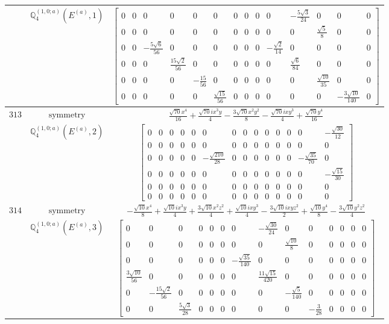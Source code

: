 \documentclass[fleqn,8pt,landscape]{jsarticle}
\begin{document}
\begin{longtable}{ccc}
$  $ & $ \mathbb{Q}_{4}^{(1,0;a)}(E^{(a)},1) $ & $ \begin{bmatrix} 0 & 0 & 0 & 0 & 0 & 0 & 0 & 0 & 0 & 0 & - \frac{5 \sqrt{3}}{24} & 0 & 0 & 0 \\ 0 & 0 & 0 & 0 & 0 & 0 & 0 & 0 & 0 & 0 & 0 & \frac{\sqrt{5}}{8} & 0 & 0 \\ 0 & 0 & - \frac{5 \sqrt{6}}{56} & 0 & 0 & 0 & 0 & 0 & 0 & - \frac{\sqrt{2}}{14} & 0 & 0 & 0 & 0 \\ 0 & 0 & 0 & \frac{15 \sqrt{2}}{56} & 0 & 0 & 0 & 0 & 0 & 0 & \frac{\sqrt{6}}{84} & 0 & 0 & 0 \\ 0 & 0 & 0 & 0 & - \frac{15}{56} & 0 & 0 & 0 & 0 & 0 & 0 & \frac{\sqrt{10}}{35} & 0 & 0 \\ 0 & 0 & 0 & 0 & 0 & \frac{\sqrt{15}}{56} & 0 & 0 & 0 & 0 & 0 & 0 & - \frac{3 \sqrt{10}}{140} & 0 \end{bmatrix} $ \\ \hline
$ 313 $ & $ \text{symmetry} $ & $ \frac{\sqrt{70} x^{4}}{16} + \frac{\sqrt{70} i x^{3} y}{4} - \frac{3 \sqrt{70} x^{2} y^{2}}{8} - \frac{\sqrt{70} i x y^{3}}{4} + \frac{\sqrt{70} y^{4}}{16} $ \\
$  $ & $ \mathbb{Q}_{4}^{(1,0;a)}(E^{(a)},2) $ & $ \begin{bmatrix} 0 & 0 & 0 & 0 & 0 & 0 & 0 & 0 & 0 & 0 & 0 & 0 & 0 & - \frac{\sqrt{30}}{12} \\ 0 & 0 & 0 & 0 & 0 & 0 & 0 & 0 & 0 & 0 & 0 & 0 & 0 & 0 \\ 0 & 0 & 0 & 0 & 0 & - \frac{\sqrt{210}}{28} & 0 & 0 & 0 & 0 & 0 & 0 & - \frac{\sqrt{35}}{70} & 0 \\ 0 & 0 & 0 & 0 & 0 & 0 & 0 & 0 & 0 & 0 & 0 & 0 & 0 & - \frac{\sqrt{15}}{30} \\ 0 & 0 & 0 & 0 & 0 & 0 & 0 & 0 & 0 & 0 & 0 & 0 & 0 & 0 \\ 0 & 0 & 0 & 0 & 0 & 0 & 0 & 0 & 0 & 0 & 0 & 0 & 0 & 0 \end{bmatrix} $ \\ \hline
$ 314 $ & $ \text{symmetry} $ & $ - \frac{\sqrt{10} x^{4}}{8} + \frac{\sqrt{10} i x^{3} y}{4} + \frac{3 \sqrt{10} x^{2} z^{2}}{4} + \frac{\sqrt{10} i x y^{3}}{4} - \frac{3 \sqrt{10} i x y z^{2}}{2} + \frac{\sqrt{10} y^{4}}{8} - \frac{3 \sqrt{10} y^{2} z^{2}}{4} $ \\
$  $ & $ \mathbb{Q}_{4}^{(1,0;a)}(E^{(a)},3) $ & $ \begin{bmatrix} 0 & 0 & 0 & 0 & 0 & 0 & 0 & - \frac{\sqrt{30}}{24} & 0 & 0 & 0 & 0 & 0 & 0 \\ 0 & 0 & 0 & 0 & 0 & 0 & 0 & 0 & \frac{\sqrt{10}}{8} & 0 & 0 & 0 & 0 & 0 \\ 0 & 0 & 0 & 0 & 0 & 0 & - \frac{\sqrt{35}}{140} & 0 & 0 & 0 & 0 & 0 & 0 & 0 \\ \frac{3 \sqrt{10}}{56} & 0 & 0 & 0 & 0 & 0 & 0 & \frac{11 \sqrt{15}}{420} & 0 & 0 & 0 & 0 & 0 & 0 \\ 0 & - \frac{15 \sqrt{2}}{56} & 0 & 0 & 0 & 0 & 0 & 0 & - \frac{\sqrt{5}}{140} & 0 & 0 & 0 & 0 & 0 \\ 0 & 0 & \frac{5 \sqrt{3}}{28} & 0 & 0 & 0 & 0 & 0 & 0 & - \frac{3}{28} & 0 & 0 & 0 & 0 \end{bmatrix} $ \\ \hline

\end{longtable}
\end{document}
